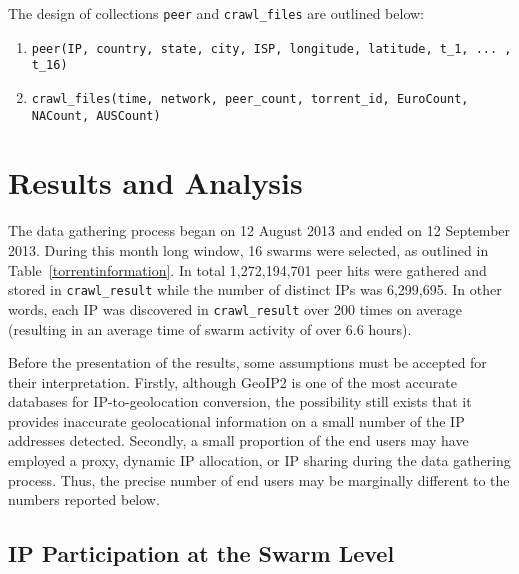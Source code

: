 \documentclass[conference]{IEEEtran}
\begin{document}
The design of collections \texttt{peer} and \texttt{crawl\_files} are outlined below:



\begin{enumerate}
\item \texttt{peer(IP, country, state, city, ISP, longitude, latitude, t\_1, ... , t\_16)}
\item \texttt{crawl\_files(time, network, peer\_count, torrent\_id, EuroCount, NACount, AUSCount)}
\end{enumerate}

\section{Results and Analysis}
The data gathering process began on 12 August 2013 and ended on 12 September 2013. During this month long window, 16 swarms were selected, as outlined in Table~\ref{torrentinformation}. In total 1,272,194,701 peer hits were gathered and stored in \texttt{crawl\_result} while the number of distinct IPs was 6,299,695. In other words, each IP was discovered in \texttt{crawl\_result} over 200 times on average (resulting in an average time of swarm activity of over 6.6 hours). 

Before the presentation of the results, some assumptions must be accepted for their interpretation. Firstly, although GeoIP2 is one of the most accurate databases for IP-to-geolocation conversion, the possibility still exists that it provides inaccurate geolocational information on a small number of the IP addresses detected. Secondly, a small proportion of the end users may have employed a proxy, dynamic IP allocation, or IP sharing during the data gathering process. Thus, the precise number of end users may be marginally different to the numbers reported below.


\subsection{IP Participation at the Swarm Level}
\end{document}
